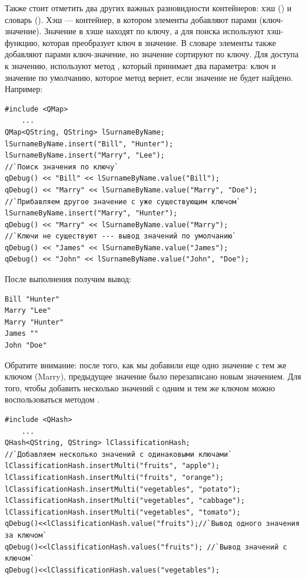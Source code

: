 Также стоит отметить два других важных разновидности контейнеров: хэш
() и словарь
(). Хэш --- контейнер, в котором элементы добавляют парами
(ключ-значение). Значение в хэше находят по
ключу, а для поиска используют хэш-функцию, которая преобразует ключ
в значение. В словаре элементы также добавляют парами ключ-значение, но значение
сортируют по ключу. Для доступа к значению, используют метод , который принимает два
параметра: ключ и значение по умолчанию, которое метод вернет, если значение не будет
найдено. Например:
\begin{lstlisting}
#include <QMap>
    ...
QMap<QString, QString> lSurnameByName;
lSurnameByName.insert("Bill", "Hunter");
lSurnameByName.insert("Marry", "Lee");
//`Поиск значения по ключу`
qDebug() << "Bill" << lSurnameByName.value("Bill");
qDebug() << "Marry" << lSurnameByName.value("Marry", "Doe");
//`Прибавляем другое значение с уже существующим ключом`
lSurnameByName.insert("Marry", "Hunter");
qDebug() << "Marry" << lSurnameByName.value("Marry");
//`Ключи не существуют --- вывод значений по умолчанию`
qDebug() << "James" << lSurnameByName.value("James");
qDebug() << "John" << lSurnameByName.value("John", "Doe");
\end{lstlisting}

После выполнения получим вывод:
\begin{verbatim}
Bill "Hunter" 
Marry "Lee" 
Marry "Hunter" 
James "" 
John "Doe"
\end{verbatim}

Обратите внимание: после того, как мы добавили еще одно значение с тем же ключом (Marry),
предыдущее значение было перезаписано новым
значением. Для того, чтобы добавить несколько значений с одним и тем же ключом можно
воспользоваться методом .
\begin{lstlisting}
#include <QHash>
    ...
QHash<QString, QString> lClassificationHash;
//`Добавляем несколько значений с одинаковыми ключами`
lClassificationHash.insertMulti("fruits", "apple");
lClassificationHash.insertMulti("fruits", "orange");
lClassificationHash.insertMulti("vegetables", "potato");
lClassificationHash.insertMulti("vegetables", "cabbage");
lClassificationHash.insertMulti("vegetables", "tomato");
qDebug()<<lClassificationHash.value("fruits");//`Вывод одного значения за ключом`
qDebug()<<lClassificationHash.values("fruits"); //`Вывод значений с ключом`
qDebug()<<lClassificationHash.values("vegetables");
\end{lstlisting}

